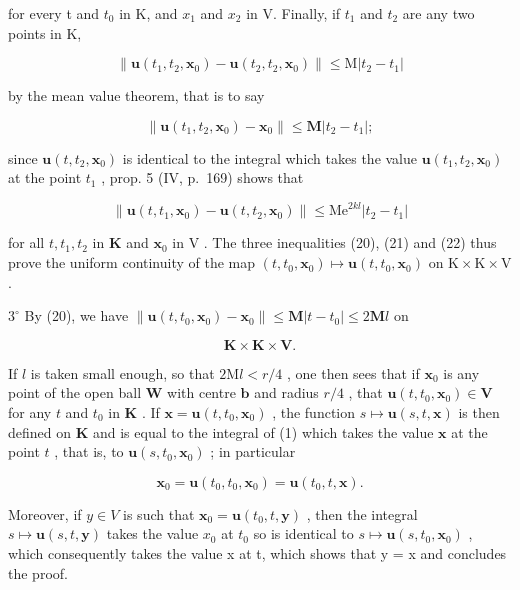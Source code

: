 for every t and \(t_{0}\) in K, and \(x_{1}\) and \(x_{2}\) in V. Finally, if \(t_{1}\) and \(t_{2}\) are any two points in K,

\[
\left\| \mathbf {u} \left(t _ {1}, t _ {2}, \mathbf {x} _ {0}\right) - \mathbf {u} \left(t _ {2}, t _ {2}, \mathbf {x} _ {0}\right) \right\| \leqslant \mathrm{M} \left| t _ {2} - t _ {1} \right|
\]

by the mean value theorem, that is to say

\[
\left\| \mathbf {u} (t _ {1}, t _ {2}, \mathbf {x} _ {0}) - \mathbf {x} _ {0} \right\| \leqslant \mathbf {M} \left| t _ {2} - t _ {1} \right|;
\]

since \(\mathbf{u}(t, t_2, \mathbf{x}_0)\) is identical to the integral which takes the value \(\mathbf{u}(t_1, t_2, \mathbf{x}_0)\) at the point \(t_1\) , prop. 5 (IV, p.~169) shows that

\[
\left\| \mathbf {u} (t, t _ {1}, \mathbf {x} _ {0}) - \mathbf {u} (t, t _ {2}, \mathbf {x} _ {0}) \right\| \leqslant \mathrm{Me} ^ {2 k l} | t _ {2} - t _ {1} |\tag{22}
\]

for all \(t, t_{1}, t_{2}\) in \(\mathbf{K}\) and \(\mathbf{x}_{0}\) in \(\mathrm{V}\) . The three inequalities (20), (21) and (22) thus prove the uniform continuity of the map \((t, t_{0}, \mathbf{x}_{0}) \mapsto \mathbf{u}(t, t_{0}, \mathbf{x}_{0})\) on \(\mathrm{K} \times \mathrm{K} \times \mathrm{V}\) .

\(3^{\circ}\) By (20), we have \(\|\mathbf{u}(t, t_{0}, \mathbf{x}_{0}) - \mathbf{x}_{0}\| \leqslant \mathbf{M} |t - t_{0}| \leqslant 2\mathbf{M}l\) on

\[
\mathbf {K} \times \mathbf {K} \times \mathbf {V}.
\]

If \(l\) is taken small enough, so that \(2\mathrm{M}l < r / 4\) , one then sees that if \(\mathbf{x}_0\) is any point of the open ball \(\mathbf{W}\) with centre \(\mathbf{b}\) and radius \(r / 4\) , that \(\mathbf{u}(t,t_0,\mathbf{x}_0)\in \mathbf{V}\) for any \(t\) and \(t_0\) in \(\mathbf{K}\) . If \(\mathbf{x} = \mathbf{u}(t,t_0,\mathbf{x}_0)\) , the function \(s\mapsto \mathbf{u}(s,t,\mathbf{x})\) is then defined on \(\mathbf{K}\) and is equal to the integral of (1) which takes the value \(\mathbf{x}\) at the point \(t\) , that is, to \(\mathbf{u}(s,t_0,\mathbf{x}_0)\) ; in particular

\[
\mathbf {x} _ {0} = \mathbf {u} (t _ {0}, t _ {0}, \mathbf {x} _ {0}) = \mathbf {u} (t _ {0}, t, \mathbf {x}).
\]

Moreover, if \(y \in V\) is such that \(\mathbf{x}_{0} = \mathbf{u}(t_{0}, t, \mathbf{y})\) , then the integral \(s \mapsto \mathbf{u}(s, t, \mathbf{y})\) takes the value \(x_{0}\) at \(t_{0}\) so is identical to \(s \mapsto \mathbf{u}(s, t_{0}, \mathbf{x}_{0})\) , which consequently takes the value x at t, which shows that y = x and concludes the proof.

